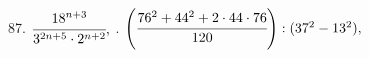 87. $\cfrac{18^{n+3}}{3^{2n+5}\cdot2^{n+2}},$ . $\left(\cfrac{76^2+44^2+2\cdot44\cdot76}{120}\right):(37^2-13^2),$\quad
